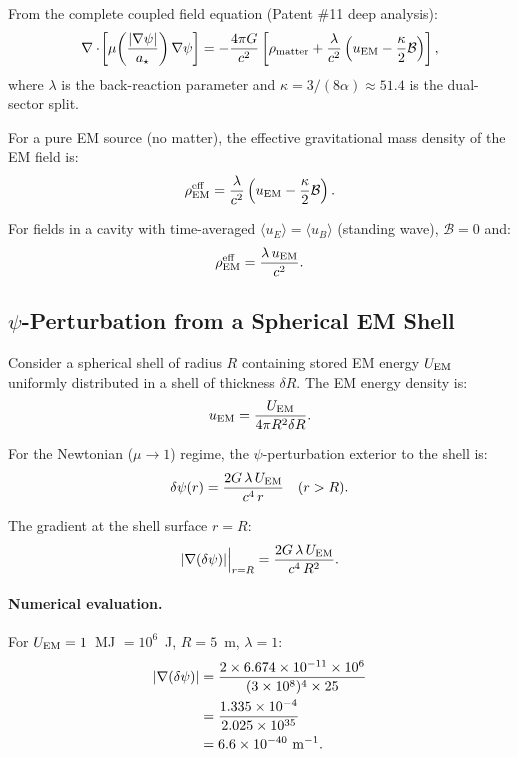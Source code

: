 \documentclass[aps,prd,twocolumn,superscriptaddress,nofootinbib]{revtex4-2}
\newcommand{\astar}{a_\star}
\newcommand{\ee}[1]{\times 10^{#1}}
\newcommand{\calB}{\mathcal{B}}
\newcommand{\lam}{\lambda}
\newcommand{\kap}{\kappa}
\begin{document}
From the complete coupled field equation (Patent \#11 deep analysis):
\begin{equation}\label{eq:sourced-field}
\nabla\cdot\!\left[\mu\!\left(\frac{|\nabla\psi|}{\astar}\right)
\nabla\psi\right] =
-\frac{4\pi G}{c^2}\left[
  \rho_{\rm matter}
  + \frac{\lam}{c^2}\left(u_{\rm EM} - \frac{\kap}{2}\calB\right)
\right],
\end{equation}
where $\lam$ is the back-reaction parameter and $\kap = 3/(8\alpha)
\approx 51.4$ is the dual-sector split.

For a pure EM source (no matter), the effective gravitational mass
density of the EM field is:
\begin{equation}
\rho_{\rm EM}^{\rm eff} = \frac{\lam}{c^2}\left(u_{\rm EM} - \frac{\kap}{2}\calB\right).
\end{equation}

For fields in a cavity with time-averaged $\langle u_E \rangle =
\langle u_B \rangle$ (standing wave), $\calB = 0$ and:
\begin{equation}
\rho_{\rm EM}^{\rm eff} = \frac{\lam\,u_{\rm EM}}{c^2}.
\end{equation}

\subsection{$\psi$-Perturbation from a Spherical EM Shell}

Consider a spherical shell of radius $R$ containing stored EM energy
$U_{\rm EM}$ uniformly distributed in a shell of thickness $\delta R$.
The EM energy density is:
\begin{equation}
u_{\rm EM} = \frac{U_{\rm EM}}{4\pi R^2 \delta R}.
\end{equation}

For the Newtonian ($\mu \to 1$) regime, the $\psi$-perturbation
exterior to the shell is:
\begin{equation}\label{eq:delta-psi-newton}
\delta\psi(r) = \frac{2G\,\lam\,U_{\rm EM}}{c^4\,r} \quad (r > R).
\end{equation}

The gradient at the shell surface $r = R$:
\begin{equation}\label{eq:grad-psi-em}
|\nabla(\delta\psi)|\Big|_{r=R} = \frac{2G\,\lam\,U_{\rm EM}}{c^4\,R^2}.
\end{equation}

\paragraph{Numerical evaluation.}
For $U_{\rm EM} = 1$~MJ $= 10^6$~J, $R = 5$~m, $\lam = 1$:
\begin{align}
|\nabla(\delta\psi)| &= \frac{2 \times 6.674\ee{-11} \times 10^6}
{(3\ee{8})^4 \times 25} \notag\\
&= \frac{1.335\ee{-4}}{2.025\ee{35}} \notag\\
&= 6.6\ee{-40}~\text{m}^{-1}.
\end{align}
\end{document}
